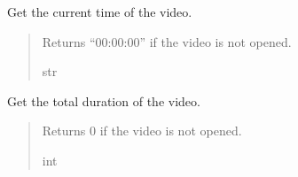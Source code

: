 \documentclass[letterpaper,10pt,english]{sphinxmanual}
\begin{document}
\begin{fulllineitems}
\begin{fulllineitems}
\label{\detokenize{general_interface:general_interface.InterfaceGenerale.get_current_video_time}}
\pysigstartsignatures
{}
\pysigstopsignatures
\sphinxAtStartPar
Get the current time of the video.
\begin{quote}\begin{description}
\sphinxAtStartPar
\begin{description}
\sphinxAtStartPar
Returns “00:00:00” if the video is not opened.

\end{description}


\sphinxAtStartPar
str

\end{description}\end{quote}

\end{fulllineitems}


\begin{fulllineitems}
\label{\detokenize{general_interface:general_interface.InterfaceGenerale.get_video_duration}}
\pysigstartsignatures
{}
\pysigstopsignatures
\sphinxAtStartPar
Get the total duration of the video.
\begin{quote}\begin{description}
\sphinxAtStartPar
\begin{description}
\sphinxAtStartPar
Returns 0 if the video is not opened.

\end{description}


\sphinxAtStartPar
int

\end{description}\end{quote}

\end{fulllineitems}



\end{fulllineitems}
\end{document}
